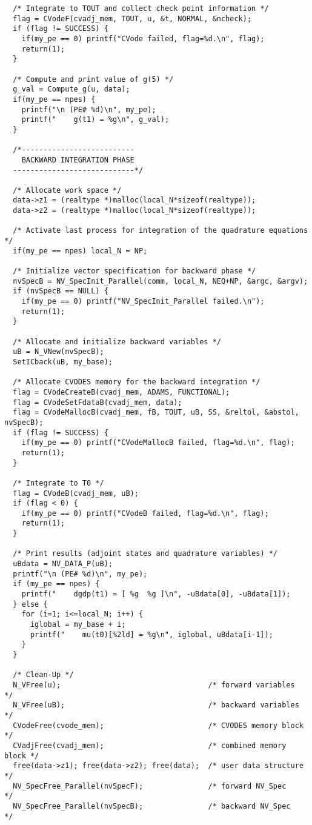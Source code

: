 \begin{verbatim}
  /* Integrate to TOUT and collect check point information */
  flag = CVodeF(cvadj_mem, TOUT, u, &t, NORMAL, &ncheck);
  if (flag != SUCCESS) {
    if(my_pe == 0) printf("CVode failed, flag=%d.\n", flag);
    return(1);
  }

  /* Compute and print value of g(5) */
  g_val = Compute_g(u, data);
  if(my_pe == npes) {
    printf("\n (PE# %d)\n", my_pe);
    printf("    g(t1) = %g\n", g_val);
  }

  /*-------------------------- 
    BACKWARD INTEGRATION PHASE 
  ----------------------------*/

  /* Allocate work space */
  data->z1 = (realtype *)malloc(local_N*sizeof(realtype));
  data->z2 = (realtype *)malloc(local_N*sizeof(realtype));

  /* Activate last process for integration of the quadrature equations */
  if(my_pe == npes) local_N = NP;

  /* Initialize vector specification for backward phase */
  nvSpecB = NV_SpecInit_Parallel(comm, local_N, NEQ+NP, &argc, &argv);
  if (nvSpecB == NULL) {
    if(my_pe == 0) printf("NV_SpecInit_Parallel failed.\n"); 
    return(1);
  }

  /* Allocate and initialize backward variables */
  uB = N_VNew(nvSpecB);
  SetICback(uB, my_base);

  /* Allocate CVODES memory for the backward integration */
  flag = CVodeCreateB(cvadj_mem, ADAMS, FUNCTIONAL);
  flag = CVodeSetFdataB(cvadj_mem, data);
  flag = CVodeMallocB(cvadj_mem, fB, TOUT, uB, SS, &reltol, &abstol, nvSpecB);
  if (flag != SUCCESS) { 
    if(my_pe == 0) printf("CVodeMallocB failed, flag=%d.\n", flag);
    return(1);
  }

  /* Integrate to T0 */
  flag = CVodeB(cvadj_mem, uB);
  if (flag < 0) { 
    if(my_pe == 0) printf("CVodeB failed, flag=%d.\n", flag);
    return(1);
  }

  /* Print results (adjoint states and quadrature variables) */
  uBdata = NV_DATA_P(uB);
  printf("\n (PE# %d)\n", my_pe);
  if (my_pe == npes) {
    printf("    dgdp(t1) = [ %g  %g ]\n", -uBdata[0], -uBdata[1]);
  } else {
    for (i=1; i<=local_N; i++) {
      iglobal = my_base + i;
      printf("    mu(t0)[%2ld] = %g\n", iglobal, uBdata[i-1]);
    }
  }

  /* Clean-Up */
  N_VFree(u);                                  /* forward variables     */
  N_VFree(uB);                                 /* backward variables    */
  CVodeFree(cvode_mem);                        /* CVODES memory block   */    
  CVadjFree(cvadj_mem);                        /* combined memory block */
  free(data->z1); free(data->z2); free(data);  /* user data structure   */
  NV_SpecFree_Parallel(nvSpecF);               /* forward NV_Spec       */
  NV_SpecFree_Parallel(nvSpecB);               /* backward NV_Spec      */
  

\end{verbatim}
